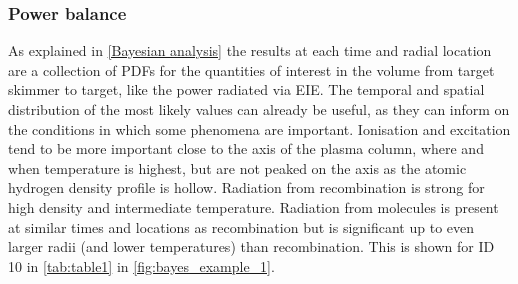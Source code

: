 \subsubsection{Power balance}\label{Power balance bayesian}
As explained in \autoref{Bayesian analysis} the results at each time and radial location are a collection of PDFs for the quantities of interest in the volume from target skimmer to target, like the power radiated via EIE. The temporal and spatial distribution of the most likely values can already be useful, as they can inform on the conditions in which some phenomena are important. Ionisation and excitation tend to be more important close to the axis of the plasma column, where and when temperature is highest, but are not peaked on the axis as the atomic hydrogen density profile is hollow. Radiation from recombination is strong for high density and intermediate temperature. Radiation from molecules is present at similar times and locations as recombination but is significant up to even larger radii (and lower temperatures) than recombination. This is shown for ID 10 in \autoref{tab:table1} in \autoref{fig:bayes_example_1}.

